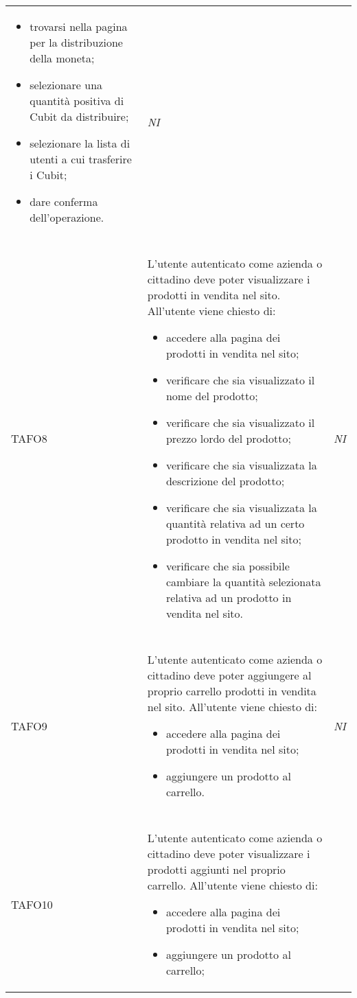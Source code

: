 \begin{longtable}{ >{\centering}p{} >{}p{}
			>{\centering}p{}}
\begin{itemize}
		 	\item trovarsi nella pagina per la distribuzione della moneta;
		 	\item selezionare una quantità positiva di Cubit da 
		 	distribuire;
		 	\item selezionare la lista di utenti a cui trasferire i Cubit; 
		 	\item dare conferma dell'operazione. 
		 \end{itemize} & \textit{NI}\\ \tabularnewline
\hypertarget{TAFO8}{TAFO8} & L'utente autenticato come azienda o cittadino deve poter visualizzare i
		 prodotti in vendita nel sito. All'utente viene chiesto di:
		 \begin{itemize}
		 	\item accedere alla pagina dei prodotti in vendita nel sito;
		 	\item verificare che sia visualizzato il nome del prodotto;
		 	\item verificare che sia visualizzato il prezzo lordo\glo{} del prodotto;
		 	\item verificare che sia visualizzata la descrizione del prodotto;
		 	\item verificare che sia visualizzata la quantità relativa ad un certo
		 	prodotto in vendita nel sito;
		 	\item verificare che sia possibile cambiare la quantità selezionata relativa ad un prodotto in
		 	vendita nel sito.
		 \end{itemize} & \textit{NI}\\ \tabularnewline
\hypertarget{TAFO9}{TAFO9} & L'utente autenticato come azienda o cittadino deve poter aggiungere
		 al proprio carrello prodotti in vendita nel sito. All'utente viene chiesto di:
		 \begin{itemize}
		 	\item accedere alla pagina dei prodotti in vendita nel sito;
		 	\item aggiungere un prodotto al carrello.
		 \end{itemize} & \textit{NI}\\ \tabularnewline
\hypertarget{TAFO10}{TAFO10} & L'utente autenticato come azienda o cittadino deve poter visualizzare i
		 prodotti aggiunti nel proprio carrello. All'utente viene chiesto di:
		 \begin{itemize}
		 	\item accedere alla pagina dei prodotti in vendita nel sito;
		 	\item aggiungere un prodotto al carrello;

\end{itemize}
\end{longtable}
